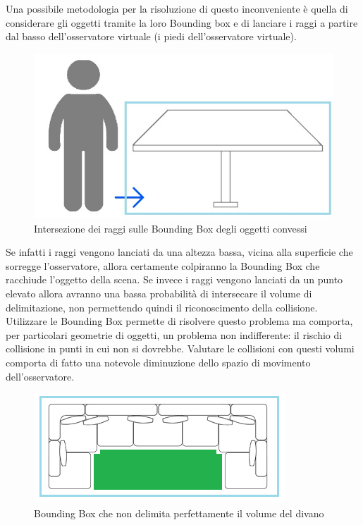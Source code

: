 Una possibile metodologia per la risoluzione di questo inconveniente è quella di considerare gli oggetti tramite la loro Bounding box e di lanciare i raggi a partire dal basso dell’osservatore virtuale (i piedi dell’osservatore virtuale).
\begin{figure}[htb]
 \centering
 \includegraphics[width=1\linewidth]{images/chapter_navigazione_scena/collision_tav2.jpg}\hfill
 \caption[Raggi sulle Bounding Box.]{Intersezione dei raggi sulle Bounding Box degli oggetti convessi}
 \label{fig:navigazione_scena_collision_tav2}
\end{figure}

Se infatti i raggi vengono lanciati da una altezza bassa, vicina alla superficie che sorregge l’osservatore, allora certamente colpiranno la Bounding Box che racchiude l’oggetto della scena. Se invece i raggi vengono lanciati da un punto elevato allora avranno una bassa probabilità di intersecare il volume di delimitazione, non permettendo quindi il riconoscimento della collisione.
\\
Utilizzare le Bounding Box permette di risolvere questo problema ma comporta, per particolari geometrie di oggetti, un problema non indifferente: il rischio di collisione in punti in cui non si dovrebbe. Valutare le collisioni con questi volumi comporta di fatto una notevole diminuzione dello spazio di movimento dell’osservatore.

\begin{figure}[htb]
 \centering
 \includegraphics[width=1\linewidth]{images/chapter_navigazione_scena/divano.png}\hfill
 \caption[Problemi utilizzo Bounding Box.]{Bounding Box che non delimita perfettamente il volume del divano}
 \label{fig:navigazione_scena_divano}
\end{figure}

